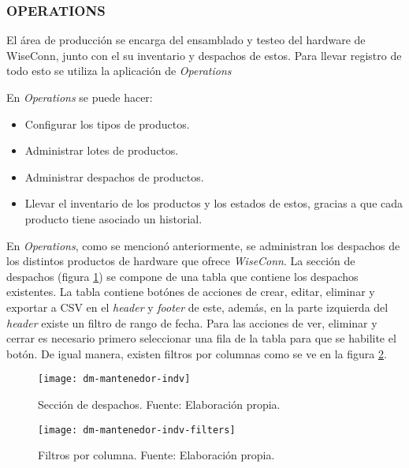 \subsubsection{OPERATIONS}

El área de producción se encarga del ensamblado y testeo del hardware de WiseConn, junto con el su inventario y despachos de estos. Para llevar registro de todo esto se utiliza la aplicación de \textit{Operations}

En \textit{Operations} se puede hacer:

\begin{itemize}
    \item Configurar los tipos de productos.
    \item Administrar lotes de productos.
    \item Administrar despachos de productos.
    \item Llevar el inventario de los productos y los estados de estos, gracias a que cada producto tiene asociado un historial.
\end{itemize}
\iffalse
{}

En \textit{Operations}, como se mencionó anteriormente, se administran los despachos de los distintos productos de hardware que ofrece \textit{WiseConn}.
La sección de despachos (figura \ref{fig:dm-mantenedor-indv}) se compone de una tabla que contiene los despachos existentes. La tabla contiene botónes de acciones de crear, editar, eliminar y exportar a CSV en el \textit{header} y \textit{footer} de este, además, en la parte izquierda del \textit{header} existe un filtro de rango de fecha. 
Para las acciones de ver, eliminar y cerrar es necesario primero seleccionar una fila de la tabla para que se habilite el botón.
De igual manera, existen filtros por columnas como se ve en la figura \ref{fig:dm-mantenedor-indv-filters}.

\begin{figure}[H]
	\centering
	\texttt{[image: dm-mantenedor-indv]}
	\caption{\label{fig:dm-mantenedor-indv} Sección de despachos. Fuente: Elaboración propia.}
\end{figure}

\begin{figure}[H]
	\centering
	\texttt{[image: dm-mantenedor-indv-filters]}
	\caption{\label{fig:dm-mantenedor-indv-filters} Filtros por columna. Fuente: Elaboración propia.}
\end{figure}

